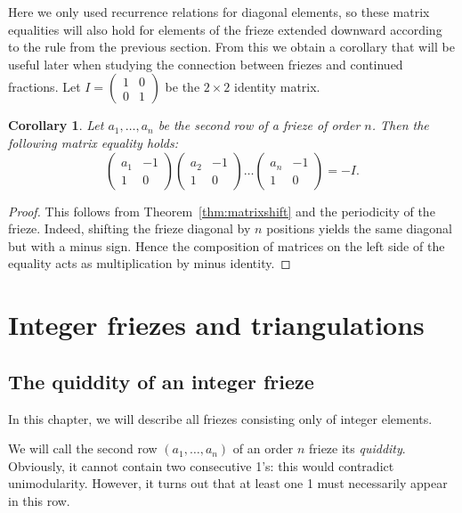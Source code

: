 \documentclass[a4paper,11pt]{amsart}
\theoremstyle{plain}
\newtheorem{corollary}[theorem]{Corollary}
\theoremstyle{remark}
\theoremstyle{definition}
\numberwithin{equation}{section}
\numberwithin{figure}{section}
\begin{document}
Here we only used recurrence relations for diagonal elements, so these matrix equalities will also hold for elements of the frieze extended downward according to the rule from the previous section. From this we obtain a corollary that will be useful later when studying the connection between friezes and continued fractions. Let $I=\begin{pmatrix}
    1&0\\0&1
\end{pmatrix}$ be the $2\times 2$ identity matrix.

\begin{corollary}\label{cor:minusid}
    Let $a_1,\dots,a_n$ be the second row of a frieze of order $n$. Then the following matrix equality holds:
    \[
    \begin{pmatrix}
        a_1 & -1\\ 1&0
    \end{pmatrix}
        \begin{pmatrix}
        a_2 & -1\\ 1&0
    \end{pmatrix}\dots    \begin{pmatrix}
        a_n & -1\\ 1&0
    \end{pmatrix}=-I.
    \]
\end{corollary}

\begin{proof}
This follows from Theorem~\ref{thm:matrixshift} and the periodicity of the frieze. Indeed, shifting the frieze diagonal by $n$ positions yields the same diagonal but with a minus sign. Hence the composition of matrices on the left side of the equality acts as multiplication by minus identity.
\end{proof}



\section{Integer friezes and triangulations}

\subsection{The quiddity of an integer frieze}

In this chapter, we will describe all friezes consisting only of integer elements.

We will call the second row $(a_1,\dots,a_n)$ of an order $n$ frieze its \emph{quiddity}. Obviously, it cannot contain two consecutive 1's: this would contradict unimodularity. However, it turns out that at least one 1 must necessarily appear in this row.
\end{document}
